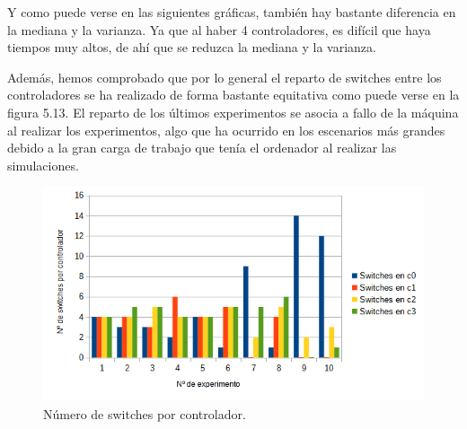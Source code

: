 \documentclass[a4paper, 12pt]{book}
\begin{document}
 	
 	Y como puede verse en las siguientes gráficas, también hay bastante diferencia en la mediana y la varianza. Ya que al haber 4 controladores, es difícil que haya tiempos muy altos, de ahí que se reduzca la mediana y la varianza.
 	
 	\begin{figure}[H]
 		\centering
 		
 		\hfill
 		\hfill
 	\end{figure}
 	
 	
 	\vspace{10pt} 
 	
 	Además, hemos comprobado que por lo general el reparto de switches entre los controladores se ha realizado de forma bastante equitativa como puede verse en la figura 5.13. El reparto de los últimos experimentos se asocia a fallo de la máquina al realizar los experimentos, algo que ha ocurrido en los escenarios más grandes debido a la gran carga de trabajo que tenía el ordenador al realizar las simulaciones. 
 	
 	
 	\begin{figure}[H]
 		\centering
 		\includegraphics[width=16cm, keepaspectratio]{img/switchesporcontrollermesh}
 		\caption{Número de switches por controlador.}
 		\label{figura:switchesporcontrollermesh}
 	\end{figure}
 	
\end{document}
